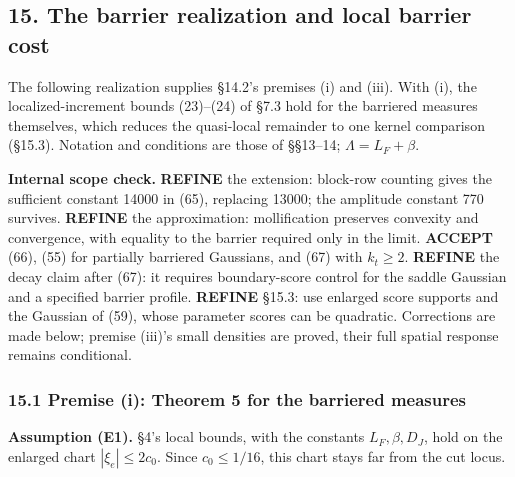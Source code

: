 \documentclass[11pt,a4paper]{article}
\begin{document}
\hypertarget{the-barrier-realization-and-local-barrier-cost}{%
\subsection{15. The barrier realization and local barrier
cost}\label{the-barrier-realization-and-local-barrier-cost}}

The following realization supplies §14.2's premises (i) and (iii). With
(i), the localized-increment bounds (23)--(24) of §7.3 hold for the
barriered measures themselves, which reduces the quasi-local remainder
to one kernel comparison (§15.3). Notation and conditions are those of
§§13--14; \(\Lambda=L_F+\beta\).

\textbf{Internal scope check.} \textbf{REFINE} the extension: block-row
counting gives the sufficient constant 14000 in (65), replacing 13000;
the amplitude constant 770 survives. \textbf{REFINE} the approximation:
mollification preserves convexity and convergence, with equality to the
barrier required only in the limit. \textbf{ACCEPT} (66), (55) for
partially barriered Gaussians, and (67) with \(k_t\ge2\).
\textbf{REFINE} the decay claim after (67): it requires boundary-score
control for the saddle Gaussian and a specified barrier profile.
\textbf{REFINE} §15.3: use enlarged score supports and the Gaussian of
(59), whose parameter scores can be quadratic. Corrections are made
below; premise (iii)'s small densities are proved, their full spatial
response remains conditional.

\hypertarget{premise-i-theorem-5-for-the-barriered-measures}{%
\subsubsection{15.1 Premise (i): Theorem 5 for the barriered
measures}\label{premise-i-theorem-5-for-the-barriered-measures}}

\textbf{Assumption (E1).} §4's local bounds, with the constants
\(L_F,\beta,D_J\), hold on the enlarged chart \(|\xi_e|\le2c_0\). Since
\(c_0\le1/16\), this chart stays far from the cut locus.
\end{document}
